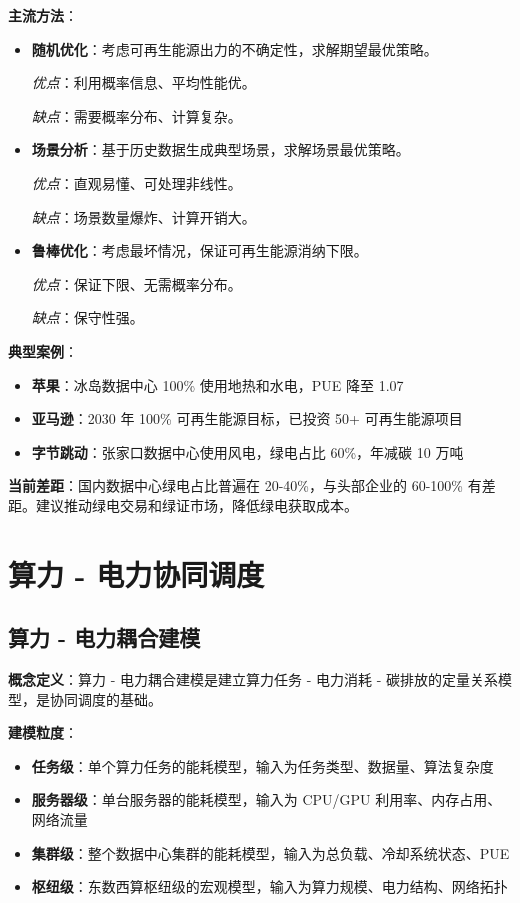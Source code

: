 \documentclass[12pt,a4paper]{article}
\begin{document}
\textbf{主流方法}：

\begin{itemize}
    \item \textbf{随机优化}：考虑可再生能源出力的不确定性，求解期望最优策略。
    
    \textit{优点}：利用概率信息、平均性能优。
    
    \textit{缺点}：需要概率分布、计算复杂。
    
    \item \textbf{场景分析}：基于历史数据生成典型场景，求解场景最优策略。
    
    \textit{优点}：直观易懂、可处理非线性。
    
    \textit{缺点}：场景数量爆炸、计算开销大。
    
    \item \textbf{鲁棒优化}：考虑最坏情况，保证可再生能源消纳下限。
    
    \textit{优点}：保证下限、无需概率分布。
    
    \textit{缺点}：保守性强。
\end{itemize}

\textbf{典型案例}：
\begin{itemize}
    \item \textbf{苹果}：冰岛数据中心 100\% 使用地热和水电，PUE 降至 1.07
    \item \textbf{亚马逊}：2030 年 100\% 可再生能源目标，已投资 50+ 可再生能源项目
    \item \textbf{字节跳动}：张家口数据中心使用风电，绿电占比 60\%，年减碳 10 万吨
\end{itemize}

\textbf{当前差距}：国内数据中心绿电占比普遍在 20-40\%，与头部企业的 60-100\% 有差距。建议推动绿电交易和绿证市场，降低绿电获取成本。

\section{算力 - 电力协同调度}
\label{sec:co-scheduling}

\subsection{算力 - 电力耦合建模}

\textbf{概念定义}：算力 - 电力耦合建模是建立算力任务 - 电力消耗 - 碳排放的定量关系模型，是协同调度的基础\cite{dong2022east}。

\textbf{建模粒度}：
\begin{itemize}
    \item \textbf{任务级}：单个算力任务的能耗模型，输入为任务类型、数据量、算法复杂度
    \item \textbf{服务器级}：单台服务器的能耗模型，输入为 CPU/GPU 利用率、内存占用、网络流量
    \item \textbf{集群级}：整个数据中心集群的能耗模型，输入为总负载、冷却系统状态、PUE
    \item \textbf{枢纽级}：东数西算枢纽级的宏观模型，输入为算力规模、电力结构、网络拓扑
\end{itemize}
\end{document}
